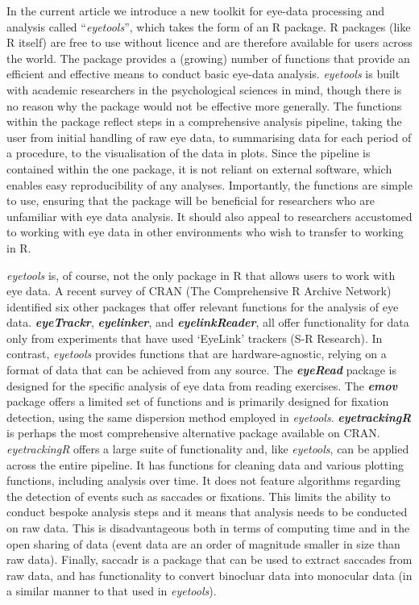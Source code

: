 \documentclass[
  man,
  floatsintext,
  longtable,
  nolmodern,
  notxfonts,
  notimes,
  colorlinks=true,linkcolor=blue,citecolor=blue,urlcolor=blue]{apa7}
\begin{document}
In the current article we introduce a new toolkit for eye-data
processing and analysis called ``\emph{eyetools}'', which takes the form
of an R package. R packages (like R itself) are free to use without
licence and are therefore available for users across the world. The
package provides a (growing) number of functions that provide an
efficient and effective means to conduct basic eye-data analysis.
\emph{eyetools} is built with academic researchers in the psychological
sciences in mind, though there is no reason why the package would not be
effective more generally. The functions within the package reflect steps
in a comprehensive analysis pipeline, taking the user from initial
handling of raw eye data, to summarising data for each period of a
procedure, to the visualisation of the data in plots. Since the pipeline
is contained within the one package, it is not reliant on external
software, which enables easy reproducibility of any analyses.
Importantly, the functions are simple to use, ensuring that the package
will be beneficial for researchers who are unfamiliar with eye data
analysis. It should also appeal to researchers accustomed to working
with eye data in other environments who wish to transfer to working in
R.

\emph{eyetools} is, of course, not the only package in R that allows
users to work with eye data. A recent survey of CRAN (The Comprehensive
R Archive Network) identified six other packages that offer relevant
functions for the analysis of eye data. \textbf{\emph{eyeTrackr}},
\textbf{\emph{eyelinker}}, and \textbf{\emph{eyelinkReader}}, all offer
functionality for data only from experiments that have used `EyeLink'
trackers (S-R Research). In contrast, \emph{eyetools} provides functions
that are hardware-agnostic, relying on a format of data that can be
achieved from any source. The \textbf{\emph{eyeRead}} package is
designed for the specific analysis of eye data from reading exercises.
The \textbf{\emph{emov}} package offers a limited set of functions and
is primarily designed for fixation detection, using the same dispersion
method employed in \emph{eyetools}. \textbf{\emph{eyetrackingR}} is
perhaps the most comprehensive alternative package available on CRAN.
\emph{eyetrackingR} offers a large suite of functionality and, like
\emph{eyetools}, can be applied across the entire pipeline. It has
functions for cleaning data and various plotting functions, including
analysis over time. It does not feature algorithms regarding the
detection of events such as saccades or fixations. This limits the
ability to conduct bespoke analysis steps and it means that analysis
needs to be conducted on raw data. This is disadvantageous both in terms
of computing time and in the open sharing of data (event data are an
order of magnitude smaller in size than raw data). Finally, saccadr is a
package that can be used to extract saccades from raw data, and has
functionality to convert binocluar data into monocular data (in a
similar manner to that used in \emph{eyetools}).
\end{document}
